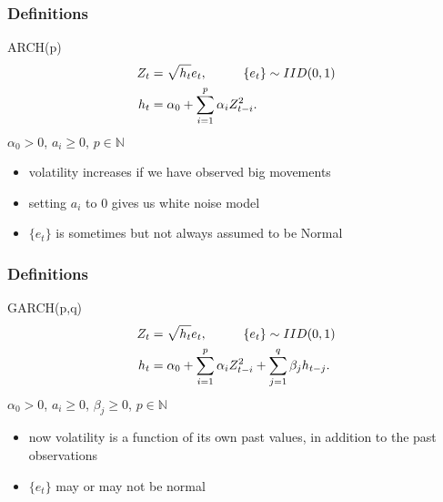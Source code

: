 \documentclass{beamer}
\begin{document}
\begin{frame}
\frametitle{Definitions}

\begin{block}{ARCH(p)}
\begin{align*}
Z_t &= \sqrt{h_t}e_t, \hspace{10mm} \{e_t\} \sim IID(0,1) \\
h_t &= \alpha_0 + \sum_{i=1}^p \alpha_i Z^2_{t-i}.
\end{align*}
$\alpha_0 > 0$, $a_i \ge 0$, $p \in \mathbb{N}$
\end{block}

\begin{itemize}
\item volatility increases if we have observed big movements
\item setting $a_i$ to $0$ gives us white noise model
\item $\{e_t\}$ is sometimes but not always assumed to be Normal
\end{itemize}

\end{frame}




\begin{frame}
\frametitle{Definitions}

\begin{block}{GARCH(p,q)}
\begin{align*}
Z_t &= \sqrt{h_t}e_t, \hspace{10mm} \{e_t\} \sim IID(0,1) \\
h_t &= \alpha_0 + \sum_{i=1}^p \alpha_i Z^2_{t-i} + \sum_{j=1}^q \beta_j h_{t-j}.
\end{align*}
$\alpha_0 > 0$, $a_i \ge 0$, $\beta_j \ge 0$, $p \in \mathbb{N}$
\end{block}

\begin{itemize}
\item now volatility is a function of its own past values, in addition to the past observations
\item $\{e_t\}$ may or may not be normal
\end{itemize}


\end{frame}

\end{document}
